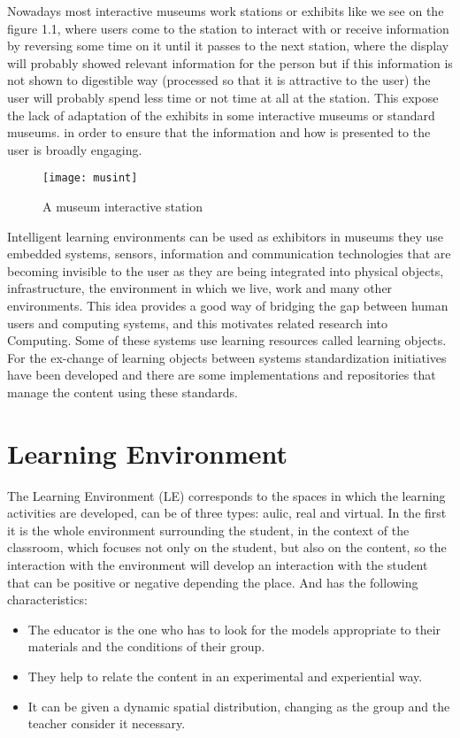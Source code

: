 Nowadays most interactive museums work stations or exhibits like we see on the figure 1.1, where users come to the station to interact with or receive information by reversing some time on it until it passes to the next station, where the display will probably showed relevant information for the person but if this information is not shown to digestible way (processed so that it is attractive to the user) the user will probably spend less time or not time at all at the station. This expose the lack of adaptation of the exhibits in some interactive museums or standard museums. in order to ensure that the information and how is presented to the user is broadly engaging. 
\begin{figure}[ht!]  
\centering  
\texttt{[image: musint]}
\quad  
\caption{A museum interactive station}  
\label{name}  
\end{figure}
Intelligent learning environments can be used as exhibitors in museums they use embedded systems, sensors, information and communication technologies that are becoming invisible to the user as they are being integrated into physical objects, infrastructure, the environment in which we live, work and many other environments. This idea provides a good way of bridging the gap between human users and computing systems, and this motivates related research into Computing. Some of these systems use learning resources called learning objects. For the ex-change of learning objects between systems standardization initiatives have been developed and there are some implementations and repositories that manage the content using these standards. 

\section{Learning Environment}

The Learning Environment (LE) corresponds to the spaces in which the learning activities are developed, can be of three types: aulic, real and virtual. In the first it is the whole environment surrounding the student, in the context of the classroom, which focuses not only on the student, but also on the content, so the interaction with the environment will develop an interaction with the student that can be positive or negative depending the place. And has the following characteristics: 
\begin{itemize}
 \item The educator is the one who has to look for the models appropriate to their materials and the conditions of their group.
 \item They help to relate the content in an experimental and experiential way.
 \item It can be given a dynamic spatial distribution, changing as the group and the teacher consider it necessary.
\end{itemize}

